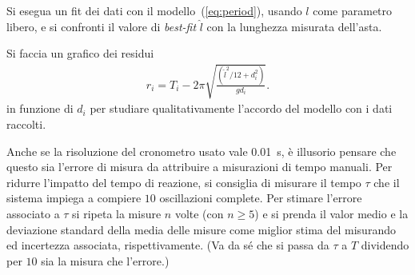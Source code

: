 \documentclass{lab1-article}
\begin{document}
\begin{article}
Si esegua un fit dei dati con il modello~(\ref{eq:period}), usando $l$ come
parametro libero, e si confronti il valore di \emph{best-fit} $\hat{l}$ con la
lunghezza misurata dell'asta.

Si faccia un grafico dei residui
\begin{align*}
  r_i = T_i - 2\pi\sqrt{\frac{(\hat{l}^2/12 + d_i^2)}{gd_i}}.
\end{align*}
in funzione di $d_i$ per studiare qualitativamente l'accordo del modello con i
dati raccolti.



\secconsiderations


Anche se la risoluzione del cronometro usato vale 0.01~s, \`e illusorio
pensare che questo sia l'errore di misura da attribuire a misurazioni di tempo
manuali.
Per ridurre l'impatto del tempo di reazione, si consiglia
di misurare il tempo $\tau$ che il sistema impiega a compiere $10$
oscillazioni complete. Per stimare l'errore associato a $\tau$ si ripeta la
misure $n$ volte (con $n \geq 5$) e si prenda il valor medio e la deviazione
standard della media delle misure come miglior stima del misurando ed incertezza
associata, rispettivamente.
(Va da s\'e che si passa da $\tau$ a $T$ dividendo per $10$ sia la misura che l'errore.)

\onecolumn




\end{article}
\end{document}
